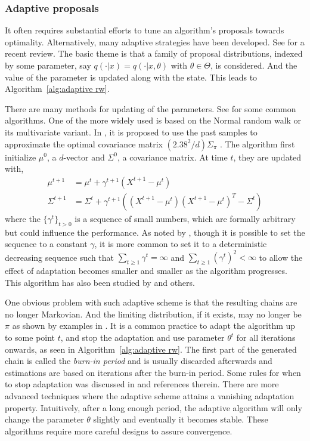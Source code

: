 \subsubsection{Adaptive proposals}
\label{ssub:Adaptive proposals}

It often requires substantial efforts to tune an algorithm's proposals towards
optimality. Alternatively, many adaptive strategies have been developed. See
\cite{Andrieu:2008kh} for a recent review. The basic theme is that a family of
proposal distributions, indexed by some parameter, say $q(\cdot|x) =
q(\cdot|x, \theta)$ with $\theta\in\Theta$, is considered. And the value of
the parameter is updated along with the state. This leads to
Algorithm~\ref{alg:adaptive rw}.



There are many methods for updating of the parameters. See
\cite{Andrieu:2008kh} for some common algorithms. One of the more widely used
is based on the Normal random walk or its multivariate variant. In
\cite{Haario:1999dh,Haario:2001gu}, it is proposed to use the past samples to
approximate the optimal covariance matrix $(2.38^2/d)\Sigma_{\pi}$
\cite{Gelman:1995vx}. The algorithm first initialize $\mu^0$, a $d$-vector and
$\Sigma^0$, a covariance matrix. At time $t$, they are updated with,
\begin{align}
  \mu^{t+1} &= \mu^t + \gamma^{t+1} (X^{t+1} - \mu^t) \\
  \Sigma^{t+1} &= \Sigma^t + \gamma^{t+1}((X^{t+1} - \mu^t)(X^{t+1} - \mu^t)^T
  - \Sigma^t)
\end{align}
where the $\{\gamma^t\}_{t>0}$ is a sequence of small numbers, which are
formally arbitrary but could influence the performance. As noted by
\cite{Andrieu:2008kh}, though it is possible to set the sequence to a constant
$\gamma$, it is more common to set it to a deterministic decreasing sequence
such that $\sum_{t\ge1}\gamma^t = \infty$ and
$\sum_{t\ge1}(\gamma^t)^2<\infty$ to allow the effect of adaptation becomes
smaller and smaller as the algorithm progresses. This algorithm has also been
studied by \cite{Andrieu:2006tw} and others.

One obvious problem with such adaptive scheme is that the resulting chains are
no longer Markovian. And the limiting distribution, if it exists, may no
longer be $\pi$ as shown by examples in \cite{Andrieu:2008kh}. It is a common
practice to adapt the algorithm up to some point $t$, and stop the adaptation
and use parameter $\theta^t$ for all iterations onwards, as seen in
Algorithm~\ref{alg:adaptive rw}. The first part of the generated chain is
called the \emph{burn-in period} and is usually discarded afterwards and
estimations are based on iterations after the burn-in period. Some rules
for when to stop adaptation was discussed in \cite{Andrieu:2008kh} and
references therein. There are more advanced techniques where the adaptive
scheme attains a vanishing adaptation property. Intuitively, after a long
enough period, the adaptive algorithm will only change the parameter $\theta$
slightly and eventually it becomes stable. These algorithms require more
careful designs to assure convergence.

